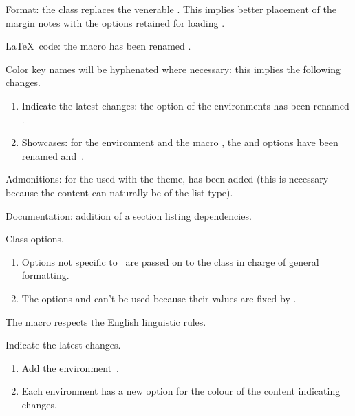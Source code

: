 \small

\begin{tdocbreak}[version = 1.7.0, date = 2024-12-04]
	\item Format: the  class replaces the venerable . This implies better placement of the margin notes with the options retained for loading .

	\item \LaTeX\ code: the macro  has been renamed .

	\item Color key names will be hyphenated where necessary: this implies the following changes.
	\begin{enumerate}
		\item Indicate the latest changes: the  option of the environments has been renamed .

		\item Showcases: for the environment  and the macro , the  and   options have been renamed  and \,.
	\end{enumerate}
\end{tdocbreak}


\begin{tdocfix}
	\item Admonitions: for the  used with the  theme,  has been added (this is necessary because the content can naturally be of the list type).
\end{tdocfix}


\begin{tdocnew}
	\item Documentation: addition of a section listing dependencies.

	\item Class options.
	\begin{enumerate}
		\item Options not specific to \thisproj\ are passed on to the class in charge of general formatting.

		\item The  options  and  can't be used because their values are fixed by \thisproj.
	\end{enumerate}

	\item The macro  respects the English linguistic rules.

	\item Indicate the latest changes.
	\begin{enumerate}
		\item Add the environment \,.

		\item Each environment has a new option  for the colour of the content indicating changes.
	\end{enumerate}
\end{tdocnew}


